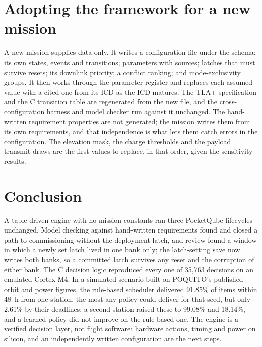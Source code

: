 \documentclass[preprint,12pt]{elsarticle}
\begin{document}
\section{Adopting the framework for a new mission}\label{sec:migration}

A new mission supplies data only. It writes a configuration file under the schema: its own states, events and transitions; parameters with sources; latches that must survive resets; its downlink priority; a conflict ranking; and mode-exclusivity groups. It then works through the parameter register and replaces each assumed value with a cited one from its ICD as the ICD matures. The TLA+ specification and the C transition table are regenerated from the new file, and the cross-configuration harness and model checker run against it unchanged. The hand-written requirement properties are not generated; the mission writes them from its own requirements, and that independence is what lets them catch errors in the configuration. The elevation mask, the charge thresholds and the payload transmit draws are the first values to replace, in that order, given the sensitivity results.

\section{Conclusion}\label{sec:conclusion}

A table-driven engine with no mission constants ran three PocketQube lifecycles unchanged. Model checking against hand-written requirements found and closed a path to commissioning without the deployment latch, and review found a window in which a newly set latch lived in one bank only; the latch-setting save now writes both banks, so a committed latch survives any reset and the corruption of either bank. The C decision logic reproduced every one of 35,763 decisions on an emulated Cortex-M4. In a simulated scenario built on POQUITO's published orbit and power figures, the rule-based scheduler delivered 91.85\% of items within 48~h from one station, the most any policy could deliver for that seed, but only 2.61\% by their deadlines; a second station raised these to 99.08\% and 18.14\%, and a learned policy did not improve on the rule-based one. The engine is a verified decision layer, not flight software: hardware actions, timing and power on silicon, and an independently written configuration are the next steps.
\end{document}
